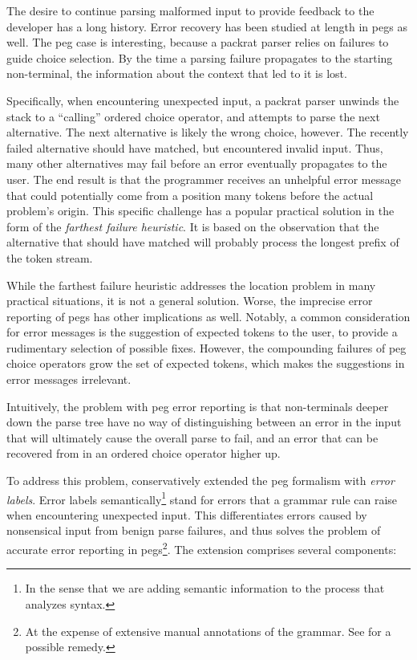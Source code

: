 The desire to continue parsing malformed input to provide feedback to the
developer has a long history\cite{graham1975practical}. Error recovery has been
studied at length in \acrlong{peg}s as well\cite{redziejowski2009mouse,
maidl2013exception, demedeiros2016parsing, demedeiros2018syntax,
demedeiros2020automatic}. The \acrshort{peg} case is interesting, because a
packrat parser relies on failures to guide choice selection. By the time a
parsing failure propagates to the starting non-terminal, the information about
the context that led to it is lost.

Specifically, when encountering unexpected input, a packrat parser unwinds the
stack to a ``calling'' ordered choice operator, and attempts to parse the next
alternative. The next alternative is likely the wrong choice, however. The
recently failed alternative should have matched, but encountered invalid input.
Thus, many other alternatives may fail before an error eventually propagates to
the user. The end result is that the programmer receives an unhelpful error
message that could potentially come from a position many tokens before the
actual problem's origin. This specific challenge has a popular practical
solution in the form of the \emph{farthest failure
heuristic}\cite{ford2002packrat-non-func}. It is based on the observation that
the alternative that should have matched will probably process the longest
prefix of the token stream.

While the farthest failure heuristic addresses the location problem in many
practical situations, it is not a general solution. Worse, the imprecise error
reporting of \acrshort{peg}s has other implications as well. Notably, a common
consideration for error messages is the suggestion of expected tokens to the
user, to provide a rudimentary selection of possible fixes. However, the
compounding failures of \acrshort{peg} choice operators grow the set of expected
tokens, which makes the suggestions in error messages irrelevant.

Intuitively, the problem with \acrshort{peg} error reporting is that
non-terminals deeper down the parse tree have no way of distinguishing between
an error in the input that will ultimately cause the overall parse to fail, and
an error that can be recovered from in an ordered choice operator higher up.

To address this problem,  conservatively
extended the \acrshort{peg} formalism with \emph{error
labels}\cite{maidl2013exception}. Error labels semantically\footnote{In the
sense that we are adding semantic information to the process that analyzes
syntax.} stand for errors that a grammar rule can raise when encountering
unexpected input. This differentiates errors caused by nonsensical input from
benign parse failures, and thus solves the problem of accurate error reporting
in \acrlong{peg}s\footnote{At the expense of extensive manual annotations of the
grammar. See \cite{demedeiros2020automatic} for a possible remedy.}. The
extension comprises several components:

